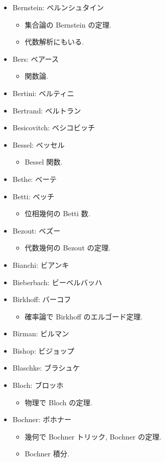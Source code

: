 \documentclass[openany, a4paper, oneside]{jsbook}
\begin{document}
\begin{itemize}
\item Bernstein: ベルンシュタイン
\begin{itemize}
\item 集合論の Bernstein の定理.
\item 代数解析にもいる.
\end{itemize}
\item Bers: ベアース
\begin{itemize}
\item 関数論.
\end{itemize}
\item Bertini: ベルティニ
\item Bertrand: ベルトラン
\item Besicovitch: ベシコビッチ
\item Bessel: ベッセル
\begin{itemize}
\item Bessel 関数.
\end{itemize}
\item Bethe: ベーテ
\item Betti: ベッチ
\begin{itemize}
\item 位相幾何の Betti 数.
\end{itemize}
\item Bezout: ベズー
\begin{itemize}
\item 代数幾何の Bezout の定理.
\end{itemize}
\item Bianchi: ビアンキ
\item Bieberbach: ビーベルバッハ
\item Birkhoff: バーコフ
\begin{itemize}
\item 確率論で Birkhoff のエルゴード定理.
\end{itemize}
\item Birman: ビルマン
\item Bishop: ビジョップ
\item Blaschke: ブラシュケ
\item Bloch: ブロッホ
\begin{itemize}
\item 物理で Bloch の定理.
\end{itemize}
\item Bochner: ボホナー
\begin{itemize}
\item 幾何で Bochner トリック, Bochner の定理.
\item Bochner 積分.

\end{itemize}
\end{itemize}
\end{document}

